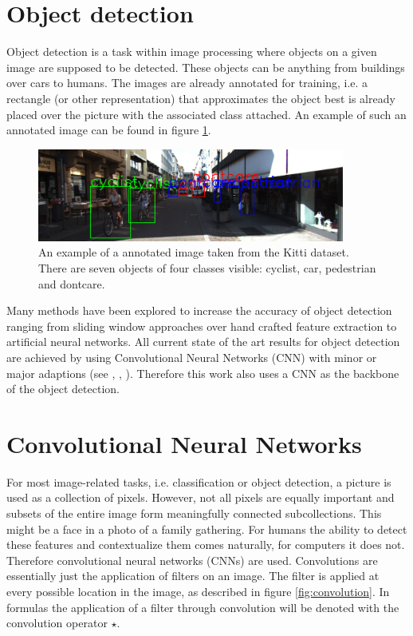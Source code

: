 \section{Object detection}

Object detection is a task within image processing where objects on a given image are supposed to be detected. These objects can be anything from buildings over cars to humans. The images are already annotated for training, i.e. a rectangle (or other representation) that approximates the object best is already placed over the picture with the associated class attached. An example of such an annotated image can be found in figure \ref*{fig:annot_example}.

\begin{figure}[!htb]
	\centering
	\includegraphics[width=0.9\textwidth]{images/Annotations_example.png}
	\caption{An example of a annotated image taken from the Kitti dataset. There are seven objects of four classes visible: cyclist, car, pedestrian and dontcare.}
	\label{fig:annot_example}
\end{figure}

Many methods have been explored to increase the accuracy of object detection ranging from sliding window approaches over hand crafted feature extraction to artificial neural networks. All current state of the art results for object detection are achieved by using Convolutional Neural Networks (CNN) with minor or major adaptions (see \cite{SSD}, \cite{FastRCNN}, \cite{FasterRCNN}). Therefore this work also uses a CNN as the backbone of the object detection.
     
\section{Convolutional Neural Networks}
\label{sec:cnns}

For most image-related tasks, i.e. classification or object detection, a picture is used as a collection of pixels. However, not all pixels are equally important and subsets of the entire image form meaningfully connected subcollections. This might be a face in a photo of a family gathering. For humans the ability to detect these features and contextualize them comes naturally, for computers it does not. Therefore convolutional neural networks (CNNs) \cite{LeCun1989BackpropagationAT} are used. Convolutions are essentially just the application of filters on an image. The filter is applied at every possible location in the image, as described in figure \ref{fig:convolution}. In formulas the application of a filter through convolution will be denoted with the convolution operator $\star$.


